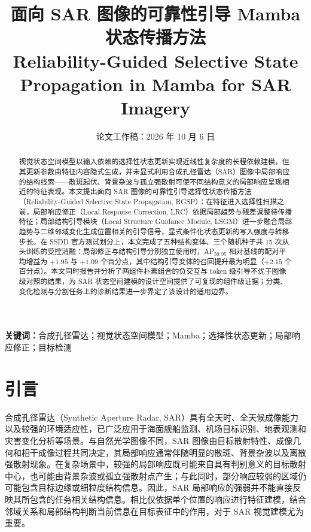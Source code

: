 \documentclass[UTF8,12pt,a4paper]{ctexart}
\title{面向 SAR 图像的可靠性引导 Mamba 状态传播方法\\
\large Reliability-Guided Selective State Propagation in Mamba for SAR Imagery}
\author{}
\date{论文工作稿：2026 年 10 月 6 日}
\begin{document}
\maketitle

\begin{abstract}
视觉状态空间模型以输入依赖的选择性状态更新实现近线性复杂度的长程依赖建模，但其更新参数由特征内容隐式生成，并未显式利用合成孔径雷达（SAR）图像中局部响应的结构线索——散斑起伏、背景杂波与孤立强散射可使不同结构意义的局部响应呈现相近的特征表现。本文提出面向 SAR 图像的可靠性引导选择性状态传播方法（Reliability-Guided Selective State Propagation, RGSP）：在特征进入选择性扫描之前，局部响应修正（Local Response Correction, LRC）依据局部趋势与残差调整待传播特征；局部结构引导模块（Local Structure Guidance Module, LSGM）进一步融合局部趋势与二维邻域变化生成位置相关的引导信号，显式条件化状态更新的写入强度与转移步长。在 SSDD 官方测试划分上，本文完成了五种结构变体、三个随机种子共 15 次从头训练的受控消融：局部修正与结构引导分别独立使用时，AP$_{50:95}$ 相对基线的配对平均增益为 $+1.95$ 与 $+1.09$ 个百分点，其中结构引导变体的召回提升最为明显（$+2.15$ 个百分点）。本文同时报告并分析了两组件朴素组合的负交互与 token 级引导不优于图像级对照的结果，为 SAR 状态空间建模的设计空间提供了可复现的组件级证据；分类、变化检测与分割任务上的诊断结果进一步界定了该设计的适用边界。
\end{abstract}
\noindent\textbf{关键词：}合成孔径雷达；视觉状态空间模型；Mamba；选择性状态更新；局部响应修正；目标检测

\section{引言}\label{sec:intro}

合成孔径雷达（Synthetic Aperture Radar, SAR）具有全天时、全天候成像能力以及较强的环境适应性，已广泛应用于海面舰船监测、机场目标识别、地表观测和灾害变化分析等场景。与自然光学图像不同，SAR 图像由目标散射特性、成像几何和相干成像过程共同决定，其局部响应通常伴随明显的散斑、背景杂波以及离散强散射现象。在复杂场景中，较强的局部响应既可能来自具有判别意义的目标散射中心，也可能由背景杂波或孤立强散射点产生；与此同时，部分响应较弱的区域仍可能包含目标边缘或细粒度结构信息。因此，SAR 局部响应的强弱并不能直接反映其所包含的任务相关结构信息。相比仅依据单个位置的响应进行特征建模，结合邻域关系和局部结构判断当前信息在目标表征中的作用，对于 SAR 视觉建模尤为重要。
\end{document}
